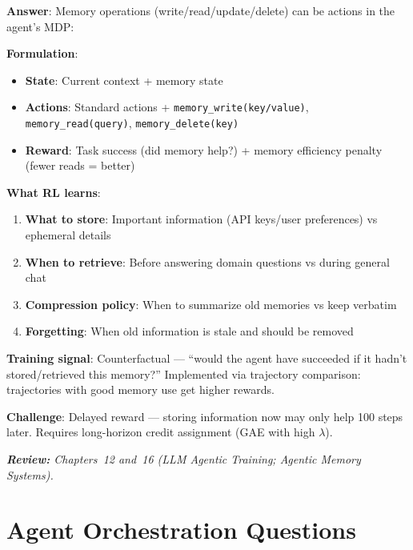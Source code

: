\begin{questionbox}
\textbf{Answer}: Memory operations (write/read/update/delete) can be actions in the agent’s MDP:

\textbf{Formulation}:

\begin{itemize}
  \item \textbf{State}: Current context + memory state
  \item \textbf{Actions}: Standard actions + \texttt{memory\_write(key/value)}, \texttt{memory\_read(query)}, \texttt{memory\_delete(key)}
  \item \textbf{Reward}: Task success (did memory help?) + memory efficiency penalty (fewer reads = better)
\end{itemize}

\textbf{What RL learns}:

\begin{enumerate}
  \item \textbf{What to store}: Important information (API keys/user preferences) vs ephemeral details
  \item \textbf{When to retrieve}: Before answering domain questions vs during general chat
  \item \textbf{Compression policy}: When to summarize old memories vs keep verbatim
  \item \textbf{Forgetting}: When old information is stale and should be removed
\end{enumerate}

\textbf{Training signal}: Counterfactual --- ``would the agent have succeeded if it hadn’t stored/retrieved this memory?'' Implemented via trajectory comparison: trajectories with good memory use get higher rewards.

\textbf{Challenge}: Delayed reward --- storing information now may only help 100 steps later. Requires long-horizon credit assignment (GAE with high $\lambda$).

\emph{\textbf{Review:} Chapters~12 and~16 (LLM Agentic Training; Agentic Memory Systems).}
\end{questionbox}

\section{Agent Orchestration Questions}
\label{agent-orchestration-questions}

